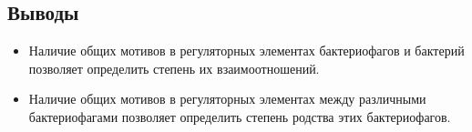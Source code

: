 \documentclass[14pt]{extarticle}
\begin{document}
    \newpage
    \begin{center}
    \item  \section{Выводы}
    \end{center}
    
    \begin{itemize}
        \item Наличие общих мотивов в регуляторных элементах бактериофагов и бактерий позволяет определить степень их 
        взаимоотношений.
        \item Наличие общих мотивов в регуляторных элементах между различными бактериофагами позволяет определить 
        степень родства этих бактериофагов.
    \end{itemize}
    
\end{document}
